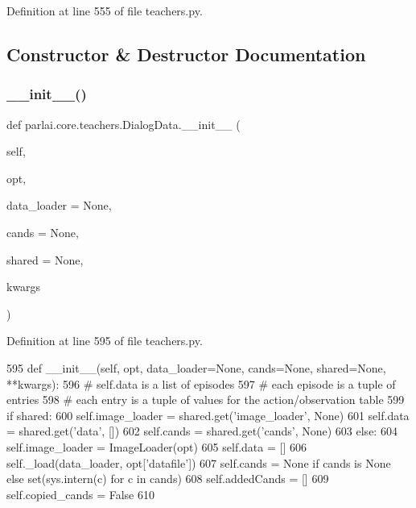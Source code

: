 Definition at line 555 of file teachers.\+py.



\subsection{Constructor \& Destructor Documentation}
\mbox{\label{classparlai_1_1core_1_1teachers_1_1DialogData_a8c20c97b259bf583c53f47d235790813}} 
\subsubsection{\texorpdfstring{\+\_\+\+\_\+init\+\_\+\+\_\+()}{\_\_init\_\_()}}
{\footnotesize\ttfamily def parlai.\+core.\+teachers.\+Dialog\+Data.\+\_\+\+\_\+init\+\_\+\+\_\+ (\begin{DoxyParamCaption}\item[{}]{self,  }\item[{}]{opt,  }\item[{}]{data\+\_\+loader = {\ttfamily None},  }\item[{}]{cands = {\ttfamily None},  }\item[{}]{shared = {\ttfamily None},  }\item[{}]{kwargs }\end{DoxyParamCaption})}



Definition at line 595 of file teachers.\+py.


\begin{DoxyCode}
595     \textcolor{keyword}{def }\_\_init\_\_(self, opt, data\_loader=None, cands=None, shared=None, **kwargs):
596         \textcolor{comment}{# self.data is a list of episodes}
597         \textcolor{comment}{# each episode is a tuple of entries}
598         \textcolor{comment}{# each entry is a tuple of values for the action/observation table}
599         \textcolor{keywordflow}{if} shared:
600             self.image\_loader = shared.get(\textcolor{stringliteral}{'image\_loader'}, \textcolor{keywordtype}{None})
601             self.data = shared.get(\textcolor{stringliteral}{'data'}, [])
602             self.cands = shared.get(\textcolor{stringliteral}{'cands'}, \textcolor{keywordtype}{None})
603         \textcolor{keywordflow}{else}:
604             self.image\_loader = ImageLoader(opt)
605             self.data = []
606             self.\_load(data\_loader, opt[\textcolor{stringliteral}{'datafile'}])
607             self.cands = \textcolor{keywordtype}{None} \textcolor{keywordflow}{if} cands \textcolor{keywordflow}{is} \textcolor{keywordtype}{None} \textcolor{keywordflow}{else} set(sys.intern(c) \textcolor{keywordflow}{for} c \textcolor{keywordflow}{in} cands)
608         self.addedCands = []
609         self.copied\_cands = \textcolor{keyword}{False}
610 
\end{DoxyCode}


